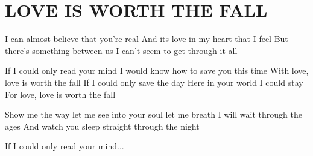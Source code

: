 \documentclass[../../../songbook.tex]{subfiles}
\begin{document}
\TabPositions{10.2cm} %
\section*{LOVE IS WORTH THE FALL}
{}
\vspace{0.5cm}
I can almost believe that you’re real	 \newline
And its love in my heart that I feel	\newline
But there’s something between us 		 \newline
I can’t seem to get through it all		 \newline

\-\hspace{1cm} If I could only read your mind			 \newline
\-\hspace{1cm} I would know how to save you this time	 \newline
\-\hspace{1cm} With love, love is worth the fall		 \newline
\-\hspace{1cm} If I could only save the day 			 \newline
\-\hspace{1cm} Here in your world I could stay			 \newline
\-\hspace{1cm} For love, love is worth the fall			 \newline

Show me the way let me see into your soul let me breath		 \newline
I will wait through the ages 								 \newline
And watch you sleep straight through the night				 \newline

\-\hspace{1cm} If I could only read your mind...\newline
\end{document}
